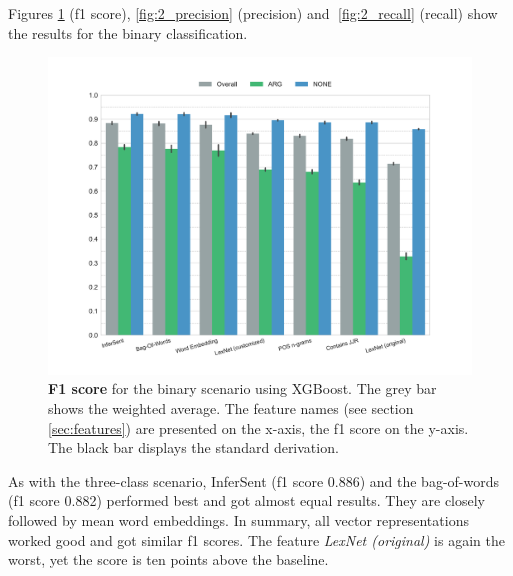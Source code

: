 \FloatBarrier

Figures \ref{fig:2_f1} (f1 score), \ref{fig:2_precision} (precision) and \ref{fig:2_recall} (recall) show the results for the binary classification.
\begin{figure}[htbp]
      \caption{\textbf{F1 score} for the binary scenario using XGBoost. The grey bar shows the weighted average. The feature names (see section \ref{sec:features}) are presented on the x-axis, the f1 score on the y-axis. The black bar displays the standard derivation.} 
 
    \label{fig:2_f1}
 \centering
	\includegraphics[width=1\textwidth]{images/experiments/f1-True}

\end{figure}
As with the three-class scenario, InferSent (f1 score 0.886) and the bag-of-words (f1 score 0.882) performed best and got almost equal results. They are closely followed by mean word embeddings. In summary, all vector representations worked good and got similar f1 scores. The feature \emph{LexNet (original)} is again the worst, yet the score is ten points above the baseline.%






